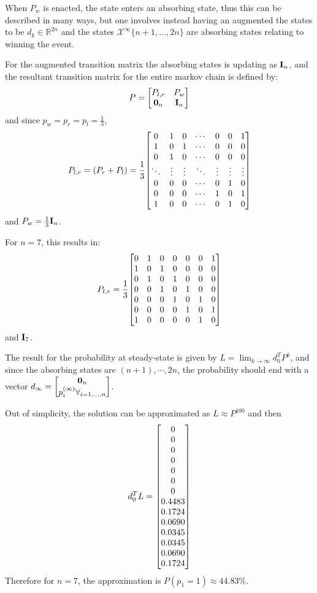 \documentclass[]{article}
\newcommand{\R}{\mathbb{R}}
\begin{document}
When $P_w$ is enacted, the state enters an absorbing state, thus this can be described in many ways, but one involves instead having an augmented the states to be $d_{k} \in \R^{2n}$ and the states $\mathcal{X}^\infty \{n+1, \dots, 2n\}$ are absorbing states relating to winning the event.

For the augmented transition matrix the absorbing states is updating as $\vb{I}_n$, and the resultant transition matrix for the entire markov chain is defined by:\[
    P = \mqty[
        P_{l,r} &  P_w\\
        \vb{0}_n & \vb{I}_n
    ]
\] and since $p_{w} = p_{r} = p_{l} = \frac{1}{3}$,
\[
    P_{l,r} = \qty(P_r + P_l) 
    = \frac{1}{3} \mqty[
        0 & 1 & 0 & \cdots & 0 & 0 & 1 \\
        1 & 0 & 1 & \cdots & 0 & 0 & 0 \\
        0 & 1 & 0 & \cdots & 0 & 0 & 0 \\
       \ddots &\vdots & \vdots & \ddots & \vdots & \vdots & \vdots \\
        0 & 0 & 0 & \cdots & 0 & 1 & 0 \\
        0 & 0 & 0 & \cdots & 1 & 0 & 1 \\
        1 & 0 & 0 & \cdots & 0 & 1 & 0
    ]
\] and $P_{w} = \frac{1}{3} \vb{I}_n$.

For $n = 7$, this results in:
\[
    P_{l,r} = \frac{1}{3} \mqty[
        0 & 1 & 0 & 0 & 0 & 0 & 1 \\
        1 & 0 & 1 & 0 & 0 & 0 & 0 \\
        0 & 1 & 0 & 1 & 0 & 0 & 0 \\
        0 & 0 & 1 & 0 & 1 & 0 & 0 \\
        0 & 0 & 0 & 1 & 0 & 1 & 0 \\
        0 & 0 & 0 & 0 & 1 & 0 & 1 \\
        1 & 0 & 0 & 0 & 0 & 1 & 0
    ]
\] and $\vb{I}_7$.

The result for the probability at steady-state is given by $L = \lim_{k\to \infty} d_0^T P^{k}$, and since the absorbing states are $(n+1),\cdots,2n$, the probability should end with a vector $d_{\infty} = \mqty[\vb{0}_n \\ p_{i}^{(\infty)} \forall_{i=1,\dots,n}]$.

Out of simplicity, the solution can be approximated as $L \approx P^{100}$ and then \[
    d_0^T L = 
    \mqty[  
        0      \\
        0      \\
        0      \\
        0      \\
        0      \\
        0      \\
        0      \\
        0.4483 \\
        0.1724 \\
        0.0690 \\
        0.0345 \\
        0.0345 \\
        0.0690 \\
        0.1724
    ]
\]
Therefore for $n=7$, the approximation is $P(p_1 = 1) \approx 44.83\%$.
\end{document}
